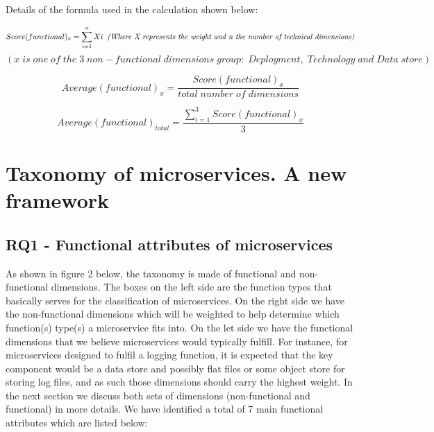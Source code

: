 \documentclass{article}
\begin{document}
Details of the formula used in the calculation shown below:

\[Score(functional)_{x}=\sum_{i=1}^{n}Xi \; \; \text{\textit{(Where X represents the weight and n the number of technical dimensions)}}\] 
\[(x \;is\; one\; of\; the \;3 \;non-functional \;dimensions\; group: \;Deployment,\; Technology \;and \;Data\; store) \]

\[Average(functional)_{x}=\frac{Score(functional)_{x}}{total \; number \; of \; dimensions} \]

\[Average(functional)_{total}=\frac{\sum_{i=1}^{3}Score(functional)_{x}}{3} \]

\section{Taxonomy of microservices. A new framework}

\subsection{RQ1 - Functional attributes of microservices}

As shown in figure 2 below, the taxonomy is made of functional and non-functional dimensions. The boxes on the left side are the function types that basically serves for the classification of microservices. On the right side we have the non-functional dimensions which will be weighted to help determine which function(s) type(s) a microservice fits into. On the let side we have the functional dimensions that we believe microservices would typically fulfill. For instance, for microservices designed to fulfil a logging function, it is expected that the key component would be a data store and possibly flat files or some object store for storing log files, and as such those dimensions should carry the highest weight. In the next section we discuss both sets of dimensions (non-functional and functional) in more details. We have identified a total of 7 main functional attributes which are listed below:
\end{document}
